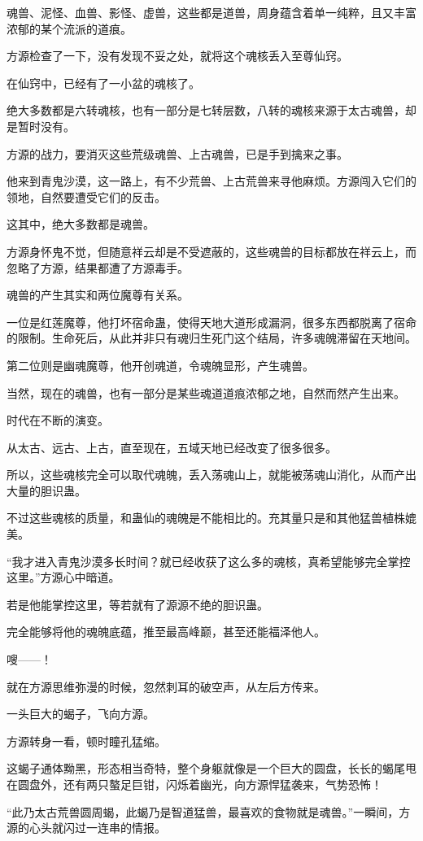 \begin{this_body}
魂兽、泥怪、血兽、影怪、虚兽，这些都是道兽，周身蕴含着单一纯粹，且又丰富浓郁的某个流派的道痕。

方源检查了一下，没有发现不妥之处，就将这个魂核丢入至尊仙窍。

在仙窍中，已经有了一小盆的魂核了。

绝大多数都是六转魂核，也有一部分是七转层数，八转的魂核来源于太古魂兽，却是暂时没有。

方源的战力，要消灭这些荒级魂兽、上古魂兽，已是手到擒来之事。

他来到青鬼沙漠，这一路上，有不少荒兽、上古荒兽来寻他麻烦。方源闯入它们的领地，自然要遭受它们的反击。

这其中，绝大多数都是魂兽。

方源身怀鬼不觉，但随意祥云却是不受遮蔽的，这些魂兽的目标都放在祥云上，而忽略了方源，结果都遭了方源毒手。

魂兽的产生其实和两位魔尊有关系。

一位是红莲魔尊，他打坏宿命蛊，使得天地大道形成漏洞，很多东西都脱离了宿命的限制。生命死后，从此并非只有魂归生死门这个结局，许多魂魄滞留在天地间。

第二位则是幽魂魔尊，他开创魂道，令魂魄显形，产生魂兽。

当然，现在的魂兽，也有一部分是某些魂道道痕浓郁之地，自然而然产生出来。

时代在不断的演变。

从太古、远古、上古，直至现在，五域天地已经改变了很多很多。

所以，这些魂核完全可以取代魂魄，丢入荡魂山上，就能被荡魂山消化，从而产出大量的胆识蛊。

不过这些魂核的质量，和蛊仙的魂魄是不能相比的。充其量只是和其他猛兽植株媲美。

“我才进入青鬼沙漠多长时间？就已经收获了这么多的魂核，真希望能够完全掌控这里。”方源心中暗道。

若是他能掌控这里，等若就有了源源不绝的胆识蛊。

完全能够将他的魂魄底蕴，推至最高峰巅，甚至还能福泽他人。

嗖——！

就在方源思维弥漫的时候，忽然刺耳的破空声，从左后方传来。

一头巨大的蝎子，飞向方源。

方源转身一看，顿时瞳孔猛缩。

这蝎子通体黝黑，形态相当奇特，整个身躯就像是一个巨大的圆盘，长长的蝎尾甩在圆盘外，还有两只螯足巨钳，闪烁着幽光，向方源悍猛袭来，气势恐怖！

“此乃太古荒兽圆周蝎，此蝎乃是智道猛兽，最喜欢的食物就是魂兽。”一瞬间，方源的心头就闪过一连串的情报。


\end{this_body}
